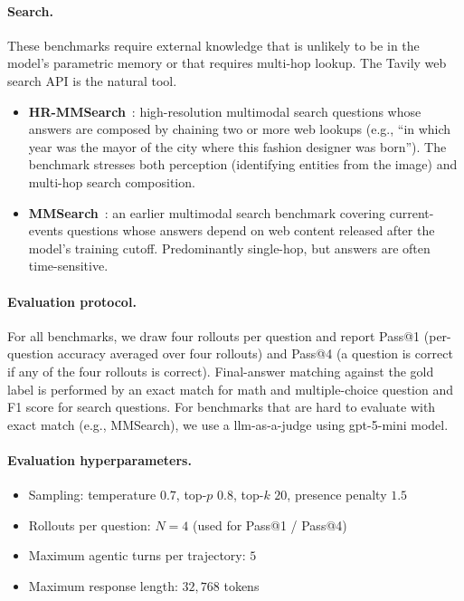 \paragraph{Search.} These benchmarks require external knowledge that is unlikely to be in the model's parametric memory or that requires multi-hop lookup. The Tavily web search API is the natural tool.
\begin{itemize}[leftmargin=*, itemsep=2pt]
    \item \textbf{HR-MMSearch}~\citep{hrmmsearch}: high-resolution multimodal search questions whose answers are composed by chaining two or more web lookups (e.g., ``in which year was the mayor of the city where this fashion designer was born''). The benchmark stresses both perception (identifying entities from the image) and multi-hop search composition.
    \item \textbf{MMSearch}~\citep{mmsearch}: an earlier multimodal search benchmark covering current-events questions whose answers depend on web content released after the model's training cutoff. Predominantly single-hop, but answers are often time-sensitive.
\end{itemize}

\paragraph{Evaluation protocol.} For all benchmarks, we draw four rollouts per question and report Pass@1 (per-question accuracy averaged over four rollouts) and Pass@4 (a question is correct if any of the four rollouts is correct). Final-answer matching against the gold label is performed by an exact match for math and multiple-choice question and F1 score for search questions. For benchmarks that are hard to evaluate with exact match (e.g., MMSearch), we use a llm-as-a-judge using gpt-5-mini model. 

\paragraph{Evaluation hyperparameters.}
\begin{itemize}[leftmargin=*, itemsep=2pt]
    \item Sampling: temperature $0.7$, top-$p$ $0.8$, top-$k$ $20$, presence penalty $1.5$
    \item Rollouts per question: $N = 4$ (used for Pass@1 / Pass@4)
    \item Maximum agentic turns per trajectory: $5$
    \item Maximum response length: $32{,}768$ tokens
\end{itemize}

